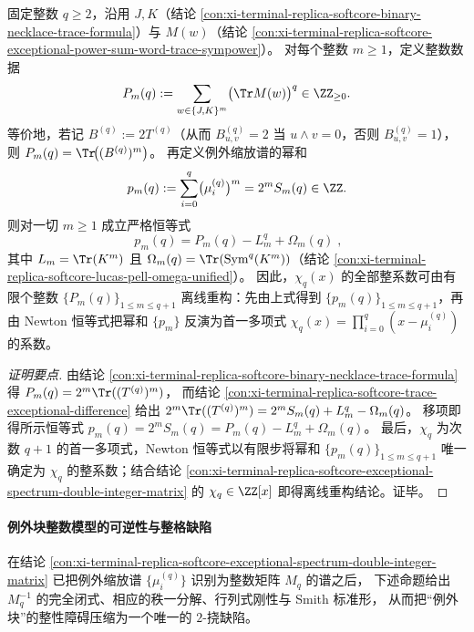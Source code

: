\begin{conclusion}\label{con:xi-terminal-replica-softcore-exceptional-spectrum-offline-newton-reconstruction}
固定整数 \(q\ge 2\)，沿用 \(J,K\)（结论 \ref{con:xi-terminal-replica-softcore-binary-necklace-trace-formula}）与 \(M(w)\)（结论 \ref{con:xi-terminal-replica-softcore-exceptional-power-sum-word-trace-sympower}）。
对每个整数 \(m\ge 1\)，定义整数数据
\[
P_m(q):=\sum_{w\in\{J,K\}^{m}}\bigl(\Tr M(w)\bigr)^{q}\in\ZZ_{\ge 0}.
\]
等价地，若记 \(B^{(q)}:=2T^{(q)}\)（从而 \(B^{(q)}_{u,v}=2\) 当 \(u\wedge v=0\)，否则 \(B^{(q)}_{u,v}=1\)），则 \(P_m(q)=\Tr\!\bigl((B^{(q)})^{m}\bigr)\)。
再定义例外缩放谱的幂和
\[
p_m(q):=\sum_{i=0}^{q}\bigl(\mu_i^{(q)}\bigr)^{m}=2^{m}S_m(q)\in\ZZ.
\]
则对一切 \(m\ge 1\) 成立严格恒等式
\[
\boxed{\;
p_m(q)=P_m(q)-L_m^{q}+\Omega_m(q)\; } ,
\]
其中 \(L_m=\Tr(K^m)\) 且 \(\Omega_m(q)=\Tr(\mathrm{Sym}^q(K^m))\)（结论 \ref{con:xi-terminal-replica-softcore-lucas-pell-omega-unified}）。
因此，\(\chi_q(x)\) 的全部整系数可由有限个整数 \(\{P_m(q)\}_{1\le m\le q+1}\) 离线重构：先由上式得到 \(\{p_m(q)\}_{1\le m\le q+1}\)，再由 Newton 恒等式把幂和 \(\{p_m\}\) 反演为首一多项式 \(\chi_q(x)=\prod_{i=0}^{q}(x-\mu_i^{(q)})\) 的系数。
\end{conclusion}
\begin{proof}[证明要点]
由结论 \ref{con:xi-terminal-replica-softcore-binary-necklace-trace-formula} 得
\(
P_m(q)=2^m\Tr((T^{(q)})^m)
\)，
而结论 \ref{con:xi-terminal-replica-softcore-trace-exceptional-difference} 给出
\(
2^m\Tr((T^{(q)})^m)=2^mS_m(q)+L_m^q-\Omega_m(q)
\)。
移项即得所示恒等式 \(p_m(q)=2^mS_m(q)=P_m(q)-L_m^q+\Omega_m(q)\)。
最后，\(\chi_q\) 为次数 \(q+1\) 的首一多项式，Newton 恒等式以有限步将幂和 \(\{p_m(q)\}_{1\le m\le q+1}\) 唯一确定为 \(\chi_q\) 的整系数；结合结论 \ref{con:xi-terminal-replica-softcore-exceptional-spectrum-double-integer-matrix} 的 \(\chi_q\in\ZZ[x]\) 即得离线重构结论。证毕。
\end{proof}

\paragraph{例外块整数模型的可逆性与整格缺陷}
在结论 \ref{con:xi-terminal-replica-softcore-exceptional-spectrum-double-integer-matrix} 已把例外缩放谱
\(\{\mu_i^{(q)}\}\) 识别为整数矩阵 \(M_q\) 的谱之后，
下述命题给出 \(M_q^{-1}\) 的完全闭式、相应的秩一分解、行列式刚性与 Smith 标准形，
从而把“例外块”的整性障碍压缩为一个唯一的 \(2\)-挠缺陷。

